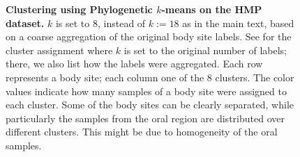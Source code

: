 \begin{figure}[hpbt]
    \centering
    \caption[Clustering using Phylogenetic $k$-means on the HMP dataset]{
        \textbf{Clustering using Phylogenetic $k$-means on the HMP dataset.}
        $k$ is set to 8, instead of $k:=18$ as in the main text,
        based on a coarse aggregation of the original body site labels.
        See  for the cluster assignment where $k$ is set to the original number of labels;
        there, we also list how the labels were aggregated.
        Each row represents a body site; each column one of the \num{8} clusters.
        The color values indicate how many samples of a body site were assigned to each cluster.
        Some of the body sites can be clearly separated,
        while particularly the samples from the oral region are distributed over different clusters.
        This might be due to %
        homogeneity of the oral samples.
    }
    \label{fig:hmp_kmeans_all_8}
\end{figure}


